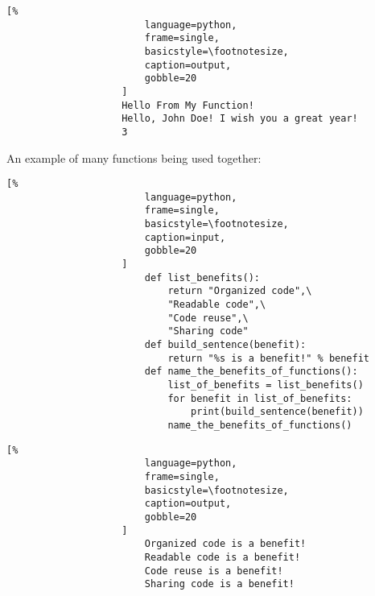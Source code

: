 \documentclass[crop=false,class=book,oneside]{standalone}
\begin{document}
                \begin{minipage}[t]{.48\textwidth}
                    \centering
                    \begin{lstlisting}[%
                        language=python,
                        frame=single,
                        basicstyle=\footnotesize,
                        caption=output,
                        gobble=20
                    ]
                    Hello From My Function!
                    Hello, John Doe! I wish you a great year!
                    3
                    \end{lstlisting}
                \end{minipage}
                \newpage
                An example of many functions being used together:
                \newline
                \begin{minipage}[t]{.48\textwidth}
                    \centering
                    \begin{lstlisting}[%
                        language=python,
                        frame=single,
                        basicstyle=\footnotesize,
                        caption=input,
                        gobble=20
                    ]
                        def list_benefits():
                            return "Organized code",\
                            "Readable code",\ 
                            "Code reuse",\
                            "Sharing code"
                        def build_sentence(benefit):
                            return "%s is a benefit!" % benefit
                        def name_the_benefits_of_functions():
                            list_of_benefits = list_benefits()
                            for benefit in list_of_benefits:
                                print(build_sentence(benefit))
                            name_the_benefits_of_functions()
                    \end{lstlisting}
                \end{minipage}\hfill
                \begin{minipage}[t]{.48\textwidth}
                    \centering
                    \begin{lstlisting}[%
                        language=python,
                        frame=single,
                        basicstyle=\footnotesize,
                        caption=output,
                        gobble=20
                    ]
                        Organized code is a benefit!
                        Readable code is a benefit!
                        Code reuse is a benefit!
                        Sharing code is a benefit!
                    \end{lstlisting}
                \end{minipage}
\end{document}
